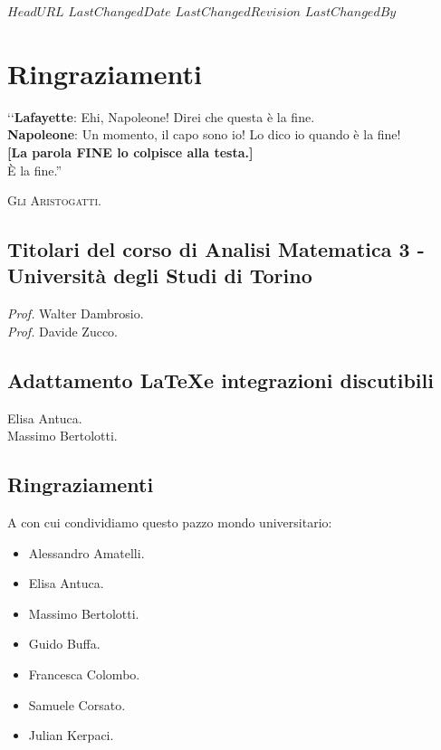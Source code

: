 \svnidlong
{$HeadURL$}
{$LastChangedDate$}
{$LastChangedRevision$}
{$LastChangedBy$}

\chapter{Ringraziamenti}

\begin{introduction}
‘‘\textbf{Lafayette}: Ehi, Napoleone! Direi che questa è la fine.\\
\textbf{Napoleone}: Un momento, il capo sono io! Lo dico io quando è la fine!\\
\textbf{[La parola \textsf{FINE} lo colpisce alla testa.]}\\
È la fine.''
\begin{flushright}
	\textsc{Gli Aristogatti.}
\end{flushright}
\end{introduction}

\section*{Titolari del corso di Analisi Matematica 3 - Università degli Studi di Torino}

\textit{Prof.} Walter Dambrosio.\\
\textit{Prof.} Davide Zucco.

\section*{Adattamento \LaTeX e integrazioni discutibili}
Elisa Antuca.\\
Massimo Bertolotti.

\section*{Ringraziamenti}
A con cui condividiamo questo pazzo mondo universitario: %
\begin{itemize}
	\item Alessandro Amatelli.
	\item Elisa Antuca.
	\item Massimo Bertolotti.
	\item Guido Buffa.
	\item Francesca Colombo.
	\item Samuele Corsato.
	\item Julian Kerpaci.
\end{itemize}